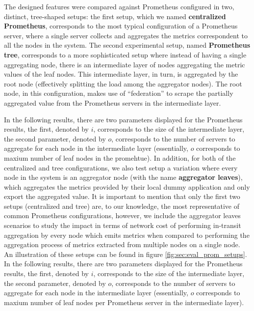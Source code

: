 The designed features were compared against Prometheus configured in two, distinct, tree-shaped setups: the first setup, which we named \textbf{centralized Prometheus}, corresponds to the most typical configuration of a Prometheus server, where a single server collects and aggregates the metrics correspondent to all the nodes in the system. The second experimental setup, named \textbf{Prometheus tree}, corresponds to a more sophisticated setup where instead of having a single aggregating node, there is an intermediate layer of nodes aggregating the metric values of the leaf nodes. This intermediate layer, in turn, is aggregated by the root node (effectively splitting the load among the aggregator nodes). The root node, in this configuration, makes use of ``federation'' to scrape the partially aggregated value from the Prometheus servers in the intermediate layer.

In the following results, there are two parameters displayed for the Prometheus results, the first, denoted by $i$, corresponds to the size of the intermediate layer, the second parameter, denoted by $o$, corresponds to the number of servers to aggregate for each node in the intermediate layer (essentially, $o$ corresponds to maxium number of leaf nodes in the promehtue). In addition, for both of the centralized and tree configurations, we also test setup a variation where every node in the system is an aggregator node (with the name \textbf{aggregator leaves}), which aggregates the metrics provided by their local dummy application and only export the aggregated value. It is important to mention that only the first two setups (centralized and tree) are, to our knowledge, the most representative of common Prometheus configurations, however, we include the aggregator leaves scenarios to study the impact in terms of network cost of performing in-transit aggregation by every node which emits metrics when compared to performing the aggregation process of metrics extracted from multiple nodes on a single node. An illustration of these setups can be found in figure \ref{fig:sec:eval_prom_setups}.
In the following results, there are two parameters displayed for the Prometheus results, the first, denoted by $i$, corresponds to the size of the intermediate layer, the second parameter, denoted by $o$, corresponds to the number of servers to aggregate for each node in the intermediate layer (essentially, $o$ corresponds to maxium number of leaf nodes per  Prometheus server in the intermediate layer).

